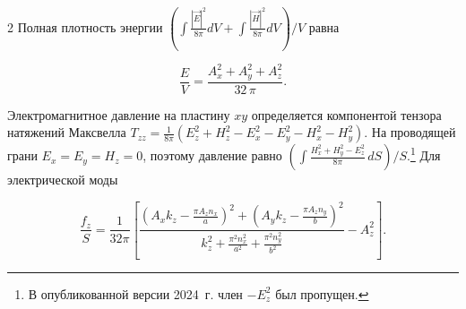 \documentclass[twoside, 10pt]{article}
\begin{document}
\begin{multicols}{2}
    Полная плотность энергии
\(\left(\int \frac{|\vec{E}|^2}{8 \pi}dV + \int \frac{|\vec{H}|^2}{8 \pi}dV\right)\big/{V}\) равна

\begin{equation}\frac{E}{V} = \frac{{A_{x}^{2} + A_{y}^{2} + A_{z}^{2}}}{32 \, \pi}.\end{equation}

    Электромагнитное давление на пластину \(xy\) определяется компонентой тензора натяжений Максвелла
\(T_{zz}=\frac1{8\pi}\left(E_z^2+H_z^2-E_x^2-E_y^2-H_x^2-H_y^2\right)\). На проводящей грани
\(E_x=E_y=H_z=0\), поэтому давление равно
\(\left(\int \frac{H_x^2+H_y^2-E_z^2}{8\pi}\,dS\right)\big/S\).\footnote{В опубликованной версии 2024~г. член \(-E_z^2\) был пропущен.} Для электрической моды

\end{multicols}

\begin{equation}\frac{f_z}{S} = \frac{1}{32\pi}\left[\frac{\left(A_{x} k_{z} - \frac{\pi A_{z} n_{x}}{a}\right)^{2} + \left(A_{y} k_{z} - \frac{\pi A_{z} n_{y}}{b}\right)^{2}}{k_{z}^{2} + \frac{\pi^{2} n_{x}^{2}}{a^{2}} + \frac{\pi^{2} n_{y}^{2}}{b^{2}}} - A_{z}^{2}\right].\end{equation}
\end{document}
